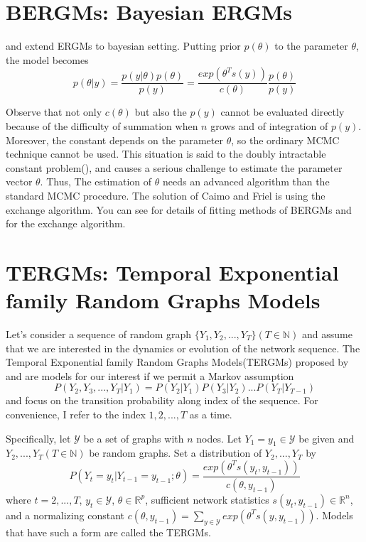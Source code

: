 \documentclass[a4paper, 11pt]{report}
\theoremstyle{definition}
\begin{document}
\section{BERGMs: Bayesian ERGMs}
\cite{RN115} and \cite{RN116} extend ERGMs to bayesian setting. 
Putting prior $p(\theta)$ to the parameter $\theta$, the model becomes
\[p(\theta|y)=\frac{p(y|\theta)p(\theta)}{p(y)}=\frac{exp(\theta^T s(y))}{c(\theta)}\frac{p(\theta)}{p(y)}\]

Observe that not only $c(\theta)$ but also the $p(y)$ cannot be evaluated directly
because of the difficulty of summation when $n$ grows and of integration of $p(y)$.
Moreover, the constant depends on the parameter $\theta$, so the ordinary MCMC technique cannot be used.
This situation is said to the doubly intractable constant problem(\cite{RN119}), 
and causes a serious challenge to estimate the parameter vector $\theta$.
Thus, The estimation of $\theta$ needs an advanced algorithm than the standard MCMC procedure.
The solution of Caimo and Friel is using the exchange algorithm. 
You can see \cite{RN115} for details of fitting methods of BERGMs
and \cite{RN127} for the exchange algorithm.


\section{TERGMs: Temporal Exponential family Random Graphs Models}
Let's consider a sequence of random graph $\{Y_1, Y_2, ..., Y_T\} (T\in\mathbb{N})$ and assume that
we are interested in the dynamics or evolution of the network sequence.
The Temporal Exponential family Random Graphs Models(TERGMs)
proposed by \cite{RN125} and \cite{RN126}
are models for our interest if we permit a Markov assumption
\[P(Y_2,Y_3,...,Y_T|Y_1)=P(Y_2|Y_1)P(Y_3|Y_2)...P(Y_T|Y_{T-1})\]
and focus on the transition probability along index of the sequence.
For convenience, I refer to the index $1,2,...,T$ as a time.

Specifically, let $\mathcal{Y}$ be a set of graphs with $n$ nodes. 
Let $Y_1=y_1 \in \mathcal{Y}$ be given and $Y_2,...,Y_T (T\in\mathbb{N})$ be random graphs.
Set a distribution of $Y_2,...,Y_T$ by
\[P(Y_t=y_t|Y_{t-1}=y_{t-1};\theta) = \frac{exp(\theta^{T}s(y_t, y_{t-1}))}{c(\theta, y_{t-1})}\]
where $t=2,...,T$, $y_t\in\mathcal{Y}$, $\theta\in\mathbb{R}^p$,
sufficient network statistics $s(y_t, y_{t-1})\in\mathbb{R}^n$,
and a normalizing constant $c(\theta, y_{t-1})=\sum_{y\in\mathcal{Y}}exp(\theta^{T}s(y, y_{t-1}))$.
Models that have such a form are called the TERGMs.
\end{document}
